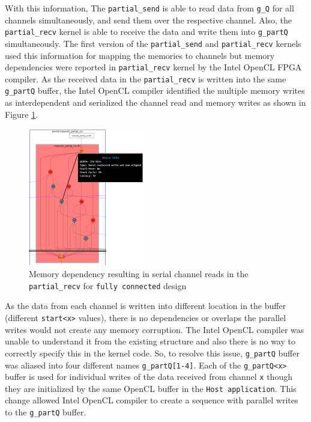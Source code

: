 With this information, The \texttt{partial\_send} is able to read data from \texttt{g\_Q}
for all channels simultaneously, and send them over the respective channel. Also, the \texttt{partial\_recv}
kernel is able to receive the data and write them into \texttt{g\_partQ} simultaneously. The first
version of the \texttt{partial\_send} and \texttt{partial\_recv} kernels used this information for
mapping the memories to channels but memory dependencies were reported in \texttt{partial\_recv} kernel by the Intel OpenCL FPGA compiler.
As the received data in the \texttt{partial\_recv} is written into the same \texttt{g\_partQ} buffer,
the Intel OpenCL compiler identified the multiple memory writes as interdependent and serialized the channel
read and memory writes as shown in Figure \ref{fig:serial_reads}.
\begin{figure}[ht]%
    \centering
    \includegraphics[width=0.45\textwidth]{images/serial_reads}
    \caption{Memory dependency resulting in serial channel reads in the \texttt{partial\_recv}
    for \texttt{fully connected} design}
    \label{fig:serial_reads}
\end{figure}
As the data from each channel is written
into different location in the buffer (different \texttt{start<x>} values), there is no
dependencies or overlaps the parallel writes would not create any memory corruption. The Intel OpenCL compiler
was unable to understand it from the existing structure and also there is no way to correctly specify this in the kernel code.
So, to resolve this issue, \texttt{g\_partQ} buffer was aliased into four
different names \texttt{g\_partQ[1-4]}. Each of the \texttt{g\_partQ<x>} buffer is used
for individual writes of the data received from channel \texttt{x} though they are initialized by the same
OpenCL buffer in the \texttt{Host application}. This change allowed
Intel OpenCL compiler to create a sequence with parallel writes to the \texttt{g\_partQ} buffer.


